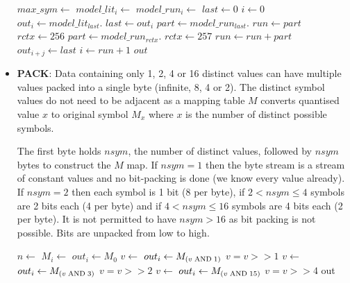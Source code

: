 \documentclass[a4paper]{article}
\begin{document}
\begin{itemize}
\begin{algorithmic}[1]
  \State $max\_sym \gets $
    \State $model\_lit_i \gets $
  \EndFor
    \State $model\_run_i \gets $
  \EndFor
  \Statex
  \State $last \gets 0$
  \State $i \gets 0$
    \State $out_i \gets model\_lit_{last}.$
    \State $last \gets out_i$
    \State $part \gets model\_run_{last}.$
    \State $run \gets part$
    \State $rctx \gets 256$
      \State $part \gets model\_run_{rctx}.$
      \State $rctx \gets 257$
      \State $run \gets run + part$
    \EndWhile
      \State $out_{i+j} \gets last$
    \EndFor
    \State $i \gets run+1$
  \EndWhile
  \State \Return $out$
\EndFunction
\end{algorithmic}

\item{\textbf{PACK}:}
Data containing only 1, 2, 4 or 16 distinct values can have multiple
values packed into a single byte (infinite, 8, 4 or 2).  The distinct
symbol values do not need to be adjacent as a mapping table $M$
converts quantised value $x$ to original symbol $M_x$ where $x$ is the
number of distinct possible symbols.

The first byte holds $nsym$, the number of distinct values, followed
by $nsym$ bytes to construct the $M$ map.  If $nsym = 1$ then the byte
stream is a stream of constant values and no bit-packing is done (we
know every value already).  If $nsym = 2$ then each symbol is 1 bit (8
per byte), if $2 < nsym \le 4$ symbols are 2 bits each (4 per byte)
and if $4 < nsym \le 16$ symbols are 4 bits each (2 per byte). It is
not permitted to have $nsym > 16$ as bit packing is not possible.
Bits are unpacked from low to high.

\begin{algorithmic}[1]
  \State $n \gets $ 
    \State $M_i \gets $ 
    \EndFor
  \Statex
   
      \State $out_i \gets M_0$
    \EndFor
  \Statex
   
        \State $v \gets$ 
      \EndIf
      \State $out_i \gets M_{(v \bitand 1)}$
      \State $v = v >> 1$
    \EndFor
  \Statex
   
        \State $v \gets$ 
      \EndIf
      \State $out_i \gets M_{(v \bitand 3)}$
      \State $v = v >> 2$
    \EndFor
  \Statex
   
        \State $v \gets$ 
      \EndIf
      \State $out_i \gets M_{(v \bitand 15)}$
      \State $v = v >> 4$
    \EndFor
  \Statex
  \Else
    \State {}
  \EndIf
  \Statex
  \State \Return out
\EndFunction
\end{algorithmic}

\end{itemize}
\end{document}
